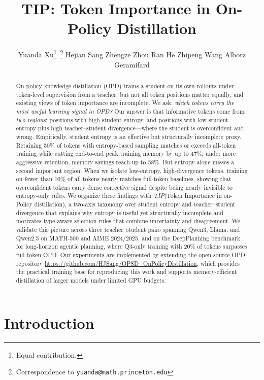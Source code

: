 \documentclass{article}
\title{TIP: Token Importance in On-Policy Distillation}
\author{
    Yuanda Xu\thanks{Equal contribution.}\,
    \thanks{Correspondence to \texttt{yuanda@math.princeton.edu}} \quad
    Hejian Sang\footnotemark[1] \quad
    Zhengze Zhou\footnotemark[1] \quad
    Ran He\footnotemark[1] \quad
    Zhipeng Wang \quad
    Alborz Geramifard
}
\begin{document}
\maketitle
\begin{abstract}
On-policy knowledge distillation (OPD) trains a student on its own rollouts under token-level supervision from a teacher, but not all token positions matter equally, and existing views of token importance are incomplete.
We ask: \emph{which tokens carry the most useful learning signal in OPD?}
Our answer is that informative tokens come from \emph{two regions}: positions with high student entropy, and positions with low student entropy plus high teacher--student divergence---where the student is overconfident and wrong.
Empirically, student entropy is an effective but structurally incomplete proxy. Retaining 50\% of tokens with entropy-based sampling matches or exceeds all-token training while cutting end-to-end peak training memory by up to 47\%; under more aggressive retention, memory savings reach up to 58\%.
But entropy alone misses a second important region. When we isolate low-entropy, high-divergence tokens, training on fewer than 10\% of all tokens nearly matches full-token baselines, showing that overconfident tokens carry dense corrective signal despite being nearly invisible to entropy-only rules.
We organize these findings with \emph{TIP}(Token Importance in on-Policy distillation), a two-axis taxonomy over student entropy and teacher--student divergence that explains why entropy is useful yet structurally incomplete and motivates type-aware selection rules that combine uncertainty and disagreement.
We validate this picture across three teacher--student pairs spanning Qwen3, Llama, and Qwen2.5 on MATH-500 and AIME 2024/2025, and on the DeepPlanning benchmark for long-horizon agentic planning, where Q3-only training with 20\% of tokens surpasses full-token OPD.
Our experiments are implemented by extending the open-source OPD repository \url{https://github.com/HJSang/OPSD_OnPolicyDistillation}, which provides the practical training base for reproducing this work and supports memory-efficient distillation of larger models under limited GPU budgets.
\end{abstract}

\section{Introduction}
\label{sec:intro}
\end{document}
